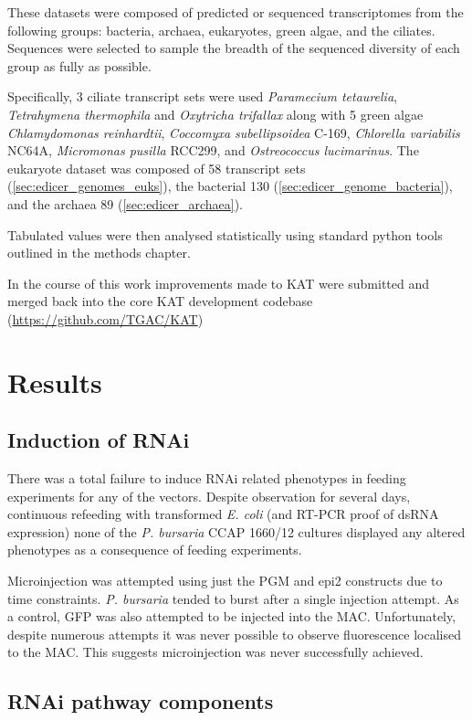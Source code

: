 These datasets were composed of predicted or sequenced transcriptomes 
from the following groups: bacteria, 
archaea, eukaryotes, green algae, and the ciliates.
Sequences were selected to sample the breadth of the sequenced
diversity of each group as fully as possible.

Specifically, 3 ciliate transcript sets were used \textit{Paramecium tetaurelia}, 
\textit{Tetrahymena thermophila} and \textit{Oxytricha trifallax} along with
5 green algae \textit{Chlamydomonas reinhardtii}, \textit{Coccomyxa subellipsoidea}
C-169, \textit{Chlorella variabilis} NC64A, \textit{Micromonas pusilla} RCC299, and
\textit{Ostreococcus lucimarinus}.
The eukaryote dataset was composed of 58 transcript
sets (\cref{sec:edicer_genomes_euks}),
the bacterial 130 (\cref{sec:edicer_genome_bacteria}), and 
the archaea 89 (\cref{sec:edicer_archaea}).

Tabulated values were then analysed statistically
using standard python tools outlined in the methods chapter.

In the course of this work improvements made to KAT were submitted and merged
back into the core KAT development codebase (\url{https://github.com/TGAC/KAT})

\section{Results}

\subsection{Induction of RNAi}

There was a total failure to induce RNAi related phenotypes
in feeding experiments for any of the vectors. 
Despite observation for several days, continuous refeeding
with transformed \textit{E. coli} (and RT-PCR proof of dsRNA expression)
none of the \textit{P. bursaria} CCAP 1660/12 
cultures displayed any altered phenotypes as a consequence of feeding experiments. 


Microinjection was attempted using just the PGM and epi2 constructs due to
time constraints.
\textit{P. bursaria} tended to burst after a single injection attempt.
As a control, GFP was also attempted to be injected into the MAC.
Unfortunately, despite numerous attempts it was never possible
to observe fluorescence localised to the MAC. This suggests
microinjection was never successfully achieved. 

\subsection{RNAi pathway components}


